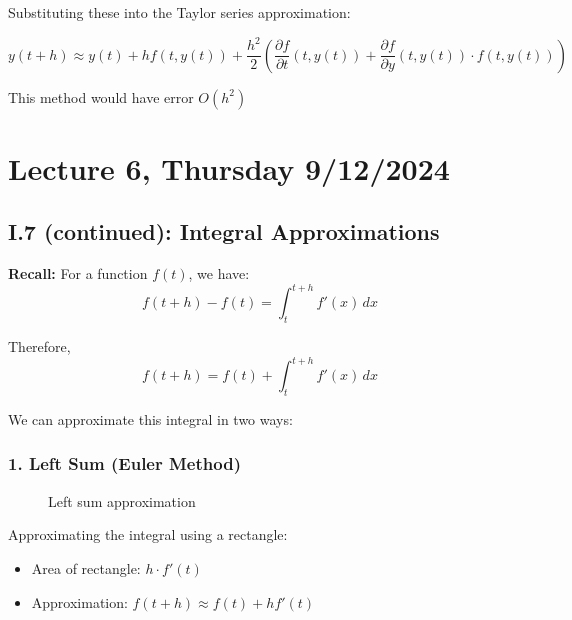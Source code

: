 \documentclass{article}
\begin{document}
Substituting these into the Taylor series approximation:

\[
y(t+h) \approx y(t) + hf(t,y(t)) + \frac{h^2}{2} \left(\frac{\partial f}{\partial t}(t,y(t)) + \frac{\partial f}{\partial y}(t,y(t)) \cdot f(t,y(t))\right)
\]

This method would have error $O(h^2)$


\section*{Lecture 6, Thursday 9/12/2024}


\subsection*{I.7 (continued): Integral Approximations}

\textbf{Recall:} For a function $f(t)$, we have:
\[
f(t+h) - f(t) = \int_t^{t+h} f'(x) \, dx
\]

Therefore,
\[
f(t+h) = f(t) + \int_t^{t+h} f'(x) \, dx
\]

We can approximate this integral in two ways:

\subsubsection*{1. Left Sum (Euler Method)}

\begin{figure}[h]
    \centering
    \caption{Left sum approximation}
\end{figure}

Approximating the integral using a rectangle:
\begin{itemize}
    \item Area of rectangle: $h \cdot f'(t)$
    \item Approximation: $f(t+h) \approx f(t) + h f'(t)$
\end{itemize}
\end{document}
